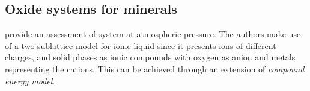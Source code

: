 \subsection{Oxide systems for minerals}

\textcite{Huang1995} provide an assessment of  system at atmospheric pressure. The authors make use of a two-sublattice model for ionic liquid since it presents ions of different charges, and solid phases as ionic compounds with oxygen as anion and metals representing the cations. This can be achieved through an extension of \emph{compound energy model}.

\endinput